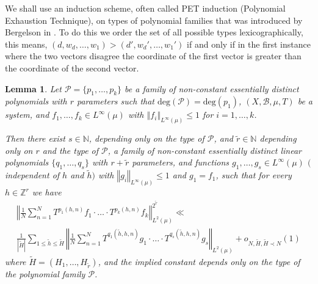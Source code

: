 \documentclass[11pt]{amsart}
\newcommand{\N}{\mathbb{N}}
\newcommand{\Z}{\mathbb{Z}}
\newcommand{\norm}[1]{\left\Vert #1\right\Vert}
\theoremstyle{plain}
\newtheorem{lemma}[theorem]{Lemma}
\theoremstyle{definition}
\theoremstyle{remark}
\begin{document}
We shall use an induction scheme, often called PET induction
(Polynomial Exhaustion Technique), on types of polynomial families
that was introduced by Bergelson in \cite{Be2}.  To do this we order
the set of all possible types lexicographically, this means,
$(d,w_d,\ldots,w_1)>(d',w_d',\ldots,w_1')$ if and only if in the first
instance where the two vectors disagree the coordinate of the first
vector is greater than the coordinate of the second vector.


\begin{lemma}\label{L:tolinear}
  Let $\mathcal{P}=\{p_1,\ldots,p_k\}$ be a family of non-constant essentially
  distinct polynomials with $r$ parameters such that $\text{deg}(\mathcal{P})=\text{deg}(p_1)$,
    $(X,\mathcal{B},\mu,T)$  be a system, and
   $f_1,\ldots,f_k\in L^\infty(\mu)$ with
  $\norm{f_i}_{L^\infty(\mu)}\leq 1$ for $i=1,\ldots, k$.

  Then  there exist $s\in\N$,
  depending only on the type of $\mathcal{P}$,  and
   $\tilde{r}\in \N$ depending only on $r$ and the type of $\mathcal{P}$,  a family of non-constant
   essentially distinct
  linear polynomials $\{q_1,\ldots, q_s\}$ with  $r+\tilde{r}$ parameters,
  and functions $g_1,\ldots, g_s \in L^\infty(\mu)$
  $($independent of $h$ and $\tilde{h}$$)$ with $\norm{g_i}_{L^\infty(\mu)}\leq 1$
  and $g_1=f_1$,  such that for every $h\in \Z^r$ we have
  \begin{multline}\label{E:CSVDC}
    \norm{\frac{1}{N}\sum_{n=1}^N T^{p_1(h,n)}f_1\cdot
      \ldots\cdot
    T^{p_k(h,n)}f_k}_{L^2(\mu)}^{2^{\tilde{r}}}\ll \\
   \frac{1}{|\tilde{H}|}\sum_{1\leq \tilde{h}\leq \tilde{H}}\norm{\frac{1}{N}
    \sum_{n=1}^N  T^{q_1(\tilde{h},h, n)}g_1\cdot \ldots\cdot
      T^{q_s(\tilde{h},h,n)}g_s}_{L^2(\mu)} +o_{N,\tilde{H}, \tilde{H}\prec N}(1)
  \end{multline}
  where $\tilde{H}=(H_1,\ldots,H_{\tilde{r}})$, and the implied constant depends only on  the type of
  the polynomial family  $\mathcal{P}$.
\end{lemma}
\end{document}
